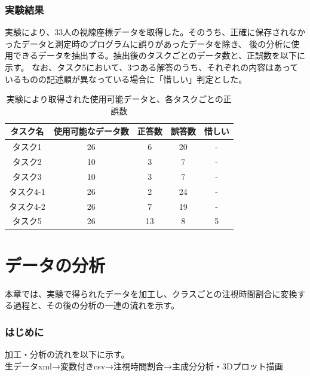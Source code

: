 \documentclass[paper=a4paper,fontsize=11pt]{jlreq}
\begin{document}
  \section{実験結果}
    実験により、33人の視線座標データを取得した。そのうち、正確に保存されなかったデータと測定時のプログラムに誤りがあったデータを除き、
    後の分析に使用できるデータを抽出する。抽出後のタスクごとのデータ数と、正誤数を以下に示す。
    なお、タスク5において、3つある解答のうち、それぞれの内容はあっているものの記述順が異なっている場合に「惜しい」判定とした。\\
    \begin{table}[h]
      \centering
      \caption{実験により取得された使用可能データと、各タスクごとの正誤数}
      \begin{tabular}{|c|c|c|c|c|}
        \hline
        タスク名&使用可能なデータ数&正答数&誤答数&惜しい\\ \hline
        タスク1&26&6&20&-\\ \hline
        タスク2&10&3&7&-\\ \hline
        タスク3&10&3&7&-\\ \hline
        タスク4-1&26&2&24&-\\ \hline
        タスク4-2&26&7&19&-\\ \hline
        タスク5&26&13&8&5\\ \hline
      \end{tabular}
      \label{tab:basic}
    \end{table}
   \FloatBarrier


\clearpage

\part{データの分析}
  本章では、実験で得られたデータを加工し、クラスごとの注視時間割合に変換する過程と、その後の分析の一連の流れを示す。

  \section{はじめに}
    加工・分析の流れを以下に示す。\\

    生データxml→変数付きcsv→注視時間割合→主成分分析・3Dプロット描画
\end{document}
